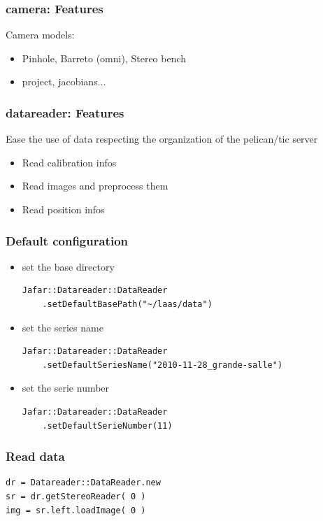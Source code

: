 \documentclass[compress]{beamer}
\begin{document}
\begin{frame}
  \frametitle{camera: Features}
  Camera models:
  \begin{itemize}
   \item Pinhole, Barreto (omni), Stereo bench
   \item project, jacobians...
  \end{itemize}

\end{frame}


\begin{frame}
  \frametitle{datareader: Features}
  Ease the use of data respecting the organization of the pelican/tic server
  \begin{itemize}
    \item<1-> Read calibration infos
    \item<2-> Read images and preprocess them
    \item<3-> Read position infos
  \end{itemize}
\end{frame}

\begin{frame}[fragile]
  \frametitle{Default configuration}
    \begin{itemize}
      \item<1-> set the base directory
        \begin{lstlisting}
Jafar::Datareader::DataReader
    .setDefaultBasePath("~/laas/data")
        \end{lstlisting}
      \item<2-> set the series name
        \begin{lstlisting}
Jafar::Datareader::DataReader
    .setDefaultSeriesName("2010-11-28_grande-salle")
        \end{lstlisting}
      \item<3-> set the serie number
        \begin{lstlisting}
Jafar::Datareader::DataReader
    .setDefaultSerieNumber(11)
        \end{lstlisting}
    \end{itemize}
\end{frame}

\begin{frame}[fragile]
  \frametitle{Read data}
  \begin{lstlisting}
dr = Datareader::DataReader.new
sr = dr.getStereoReader( 0 )
img = sr.left.loadImage( 0 )
  \end{lstlisting}
\end{frame}
\end{document}
